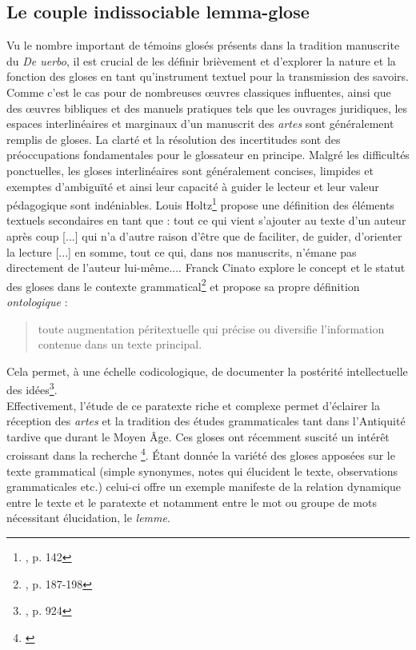 \documentclass[a4paper, twoside, 12pt]{book}
\begin{document}
\subsection{Le couple indissociable lemma-glose}

Vu le nombre important de témoins glosés présents dans la tradition manuscrite du \textit{De uerbo}, il est crucial de les définir brièvement et d'explorer la nature et la fonction des gloses en tant qu'instrument textuel pour la transmission des savoirs. Comme c'est le cas pour de nombreuses œuvres classiques influentes, ainsi que des œuvres bibliques et des manuels pratiques tels que les ouvrages juridiques, les espaces interlinéaires et marginaux d'un manuscrit des \textit{artes} sont généralement remplis de gloses.
La clarté et la résolution des incertitudes sont des préoccupations fondamentales pour le glossateur en principe. Malgré les difficultés ponctuelles, les gloses interlinéaires sont généralement concises, limpides et exemptes d'ambiguïté et ainsi leur capacité à guider le lecteur et leur valeur pédagogique sont indéniables. Louis Holtz\footnote{\cite{holtz1984gloses}, p. 142} propose une définition des éléments textuels secondaires en tant que : \og{}tout ce qui vient s'ajouter au texte d'un auteur après coup [...] qui n'a d'autre raison d'être que de faciliter, de guider, d'orienter la lecture [...] en somme, tout ce qui, dans nos manuscrits, n'émane pas directement de l'auteur lui-même...\fg{}. Franck Cinato explore le concept et le statut des gloses dans le contexte grammatical\footnote{\cite{cinato2015priscien}, p. 187-198} et propose sa propre définition \textit{ontologique} : \blockquote{toute augmentation péritextuelle qui précise ou diversifie l'information contenue dans un texte principal.} Cela permet, à une échelle codicologique, de \og{}documenter la postérité intellectuelle des idées\footnote{\cite{dinkova2020text}, p. 924}\fg{}.\\

Effectivement, l'étude de ce paratexte riche et complexe permet d'éclairer la réception des \textit{artes} et la tradition des études grammaticales tant dans l'Antiquité tardive que durant le Moyen Âge. Ces gloses ont récemment suscité un intérêt croissant dans la recherche \footnote{\cite{monella2019digital}}. Étant donnée la variété des gloses apposées sur le texte grammatical (simple synonymes, notes qui élucident le texte, observations grammaticales etc.) celui-ci offre un exemple manifeste de la relation dynamique entre le texte et le paratexte et notamment entre le mot ou groupe de mots nécessitant élucidation, le \textit{lemme}.\\
\end{document}
